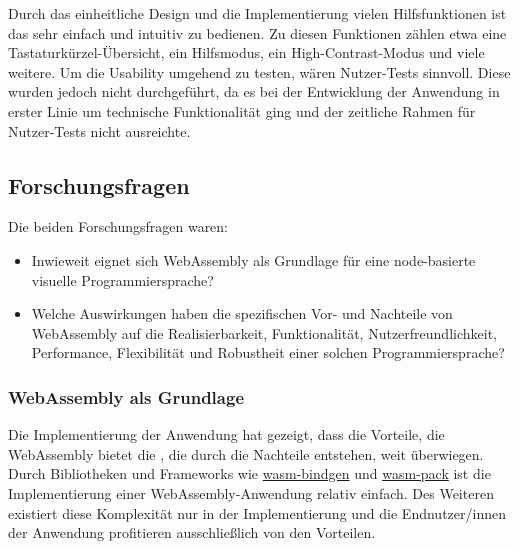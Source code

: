 \documentclass[ngerman]{article}
\begin{document}
Durch das einheitliche Design und die Implementierung vielen Hilfsfunktionen ist das  sehr einfach und intuitiv zu bedienen. Zu diesen Funktionen zählen etwa eine Tastaturkürzel-Übersicht, ein Hilfsmodus, ein High-Contrast-Modus und viele weitere.
\br
Um die Usability umgehend zu testen, wären Nutzer-Tests sinnvoll. Diese wurden jedoch nicht durchgeführt, da es bei der Entwicklung der Anwendung in erster Linie um technische Funktionalität ging und der zeitliche Rahmen für Nutzer-Tests nicht ausreichte.

\subsection{Forschungsfragen}

Die beiden Forschungsfragen waren:

\begin{itemize}
  \item Inwieweit eignet sich WebAssembly als Grundlage für eine node-basierte visuelle Programmiersprache?  
  \item Welche Auswirkungen haben die spezifischen Vor- und Nachteile von WebAssembly auf die Realisierbarkeit, Funktionalität, Nutzerfreundlichkeit, Performance, Flexibilität und Robustheit einer solchen Programmiersprache?
\end{itemize}

\subsubsection{WebAssembly als Grundlage}
Die Implementierung der Anwendung hat gezeigt, dass die Vorteile, die WebAssembly bietet die , die durch die Nachteile entstehen, weit überwiegen. Durch Bibliotheken und Frameworks wie \href{https://rustwasm.github.io/wasm-bindgen/}{wasm-bindgen} und \href{https://rustwasm.github.io/wasm-pack/book/}{wasm-pack} ist die Implementierung einer WebAssembly-Anwendung relativ einfach. 
\br
Des Weiteren existiert diese Komplexität nur in der Implementierung und die Endnutzer/innen der Anwendung profitieren ausschließlich von den Vorteilen.
\end{document}
